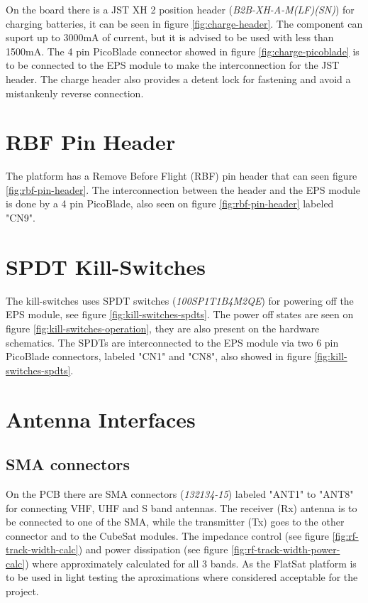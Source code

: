 On the board there is a JST XH 2 position header (\textit{B2B-XH-A-M(LF)(SN)}) for charging batteries, it can be seen in figure \ref{fig:charge-header}. The component can suport up to 3000mA of current, but it is advised to be used with less than 1500mA. The 4 pin PicoBlade connector showed in figure \ref{fig:charge-picoblade} is to be connected to the EPS module to make the interconnection for the JST header. The charge header also provides a detent lock for fastening and avoid a mistankenly reverse connection.

\section{RBF Pin Header}

The platform has a Remove Before Flight (RBF) pin header that can seen figure \ref{fig:rbf-pin-header}. The interconnection between the header and the EPS module is done by a 4 pin PicoBlade, also seen on figure \ref{fig:rbf-pin-header} labeled "CN9".

\section {SPDT Kill-Switches}

The kill-switches uses SPDT switches (\textit{100SP1T1B4M2QE}) for powering off the EPS module, see figure \ref{fig:kill-switches-spdts}. The power off states are seen on figure \ref{fig:kill-switches-operation}, they are also present on the hardware schematics. The SPDTs are interconnected to the EPS module via two 6 pin PicoBlade connectors, labeled "CN1" and "CN8", also showed in figure \ref{fig:kill-switches-spdts}.

\section{Antenna Interfaces}

\subsection{SMA connectors}

On the PCB there are SMA connectors (\textit{132134-15}) labeled "ANT1" to "ANT8" for connecting VHF, UHF and S band antennas. The receiver (Rx) antenna is to be connected to one of the SMA, while the transmitter (Tx) goes to the other connector and to the CubeSat modules. The impedance control (see figure \ref{fig:rf-track-width-calc}) and power dissipation (see figure \ref{fig:rf-track-width-power-calc}) where approximately calculated for all 3 bands. As the FlatSat platform is to be used in light testing the aproximations where considered acceptable for the project.

